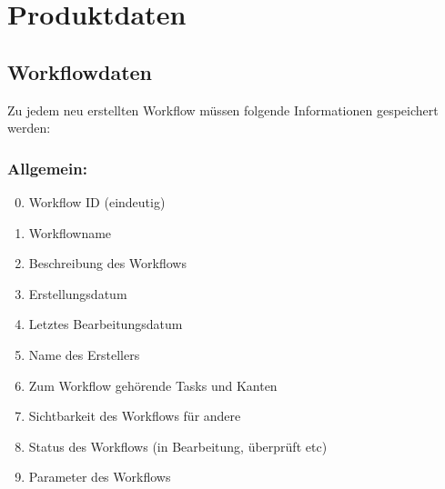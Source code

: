 

\chapter{Produktdaten}

    \section{Workflowdaten}
    Zu jedem neu erstellten Workflow müssen folgende Informationen gespeichert werden:
        \subsection{Allgemein:}
            \begin{enumerate}[font={\bfseries}, label=PD1{\arabic*}0, wide=0pt, labelindent=1em, leftmargin=*]
                \setcounter{enumi}{-1}
                \item \label{workflowID:1} Workflow ID (eindeutig)
                \item Workflowname
                \item Beschreibung des Workflows
                \item Erstellungsdatum
                \item \label{letztesBearbeitungsdatum} Letztes Bearbeitungsdatum
                \item Name des Erstellers
                \item \label{korrekteSpeicherungDesWorkflows} Zum Workflow gehörende Tasks und Kanten
                \item \label{Sichtbarkeit} Sichtbarkeit des Workflows für andere
                \item \label{statusDesWorkflows} Status des Workflows (in Bearbeitung, überprüft etc)
                \item \label{Parameter}  Parameter des Workflows
            \end{enumerate}
